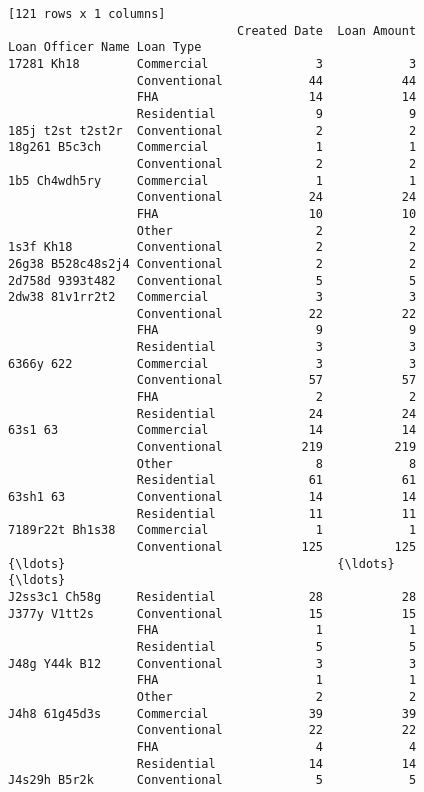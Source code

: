 \documentclass[11pt]{article}
\begin{document}
\begin{Verbatim}[commandchars=\\\{\}]
[121 rows x 1 columns]
                                Created Date  Loan Amount
Loan Officer Name Loan Type                              
17281 Kh18        Commercial               3            3
                  Conventional            44           44
                  FHA                     14           14
                  Residential              9            9
185j t2st t2st2r  Conventional             2            2
18g261 B5c3ch     Commercial               1            1
                  Conventional             2            2
1b5 Ch4wdh5ry     Commercial               1            1
                  Conventional            24           24
                  FHA                     10           10
                  Other                    2            2
1s3f Kh18         Conventional             2            2
26g38 B528c48s2j4 Conventional             2            2
2d758d 9393t482   Conventional             5            5
2dw38 81v1rr2t2   Commercial               3            3
                  Conventional            22           22
                  FHA                      9            9
                  Residential              3            3
6366y 622         Commercial               3            3
                  Conventional            57           57
                  FHA                      2            2
                  Residential             24           24
63s1 63           Commercial              14           14
                  Conventional           219          219
                  Other                    8            8
                  Residential             61           61
63sh1 63          Conventional            14           14
                  Residential             11           11
7189r22t Bh1s38   Commercial               1            1
                  Conventional           125          125
{\ldots}                                      {\ldots}          {\ldots}
J2ss3c1 Ch58g     Residential             28           28
J377y V1tt2s      Conventional            15           15
                  FHA                      1            1
                  Residential              5            5
J48g Y44k B12     Conventional             3            3
                  FHA                      1            1
                  Other                    2            2
J4h8 61g45d3s     Commercial              39           39
                  Conventional            22           22
                  FHA                      4            4
                  Residential             14           14
J4s29h B5r2k      Conventional             5            5

\end{Verbatim}
\end{document}
